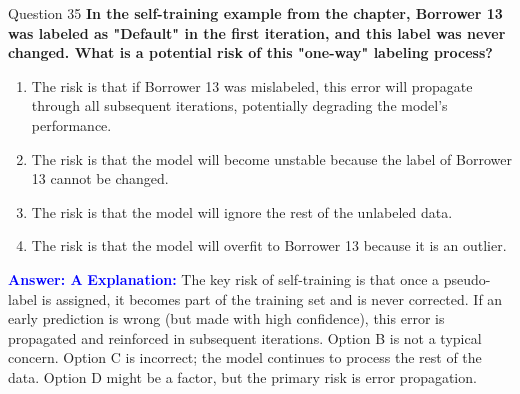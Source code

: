 \documentclass[8pt]{beamer}  %
\begin{document}
	\begin{frame}{Question 35}
		\textbf{In the self-training example from the chapter, Borrower 13 was labeled as "Default" in the first iteration, and this label was never changed. What is a potential risk of this "one-way" labeling process?}
		\begin{enumerate}
			\item The risk is that if Borrower 13 was mislabeled, this error will propagate through all subsequent iterations, potentially degrading the model's performance.
			\item The risk is that the model will become unstable because the label of Borrower 13 cannot be changed.
			\item The risk is that the model will ignore the rest of the unlabeled data.
			\item The risk is that the model will overfit to Borrower 13 because it is an outlier.
		\end{enumerate}
		\vspace{0.2cm}
		\textcolor{blue}{\textbf{Answer: A}}
		\vspace{0.2cm}
		\textcolor{blue}{\textbf{Explanation:}} The key risk of self-training is that once a pseudo-label is assigned, it becomes part of the training set and is never corrected. If an early prediction is wrong (but made with high confidence), this error is propagated and reinforced in subsequent iterations. Option B is not a typical concern. Option C is incorrect; the model continues to process the rest of the data. Option D might be a factor, but the primary risk is error propagation.
	\end{frame}
	
\end{document}
